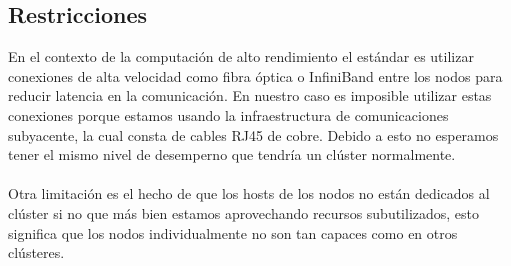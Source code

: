 \subsection{Restricciones}
En el contexto de la computación de alto rendimiento el estándar es utilizar conexiones de alta velocidad como fibra óptica o InfiniBand entre los nodos para reducir latencia en la comunicación. En nuestro caso es imposible utilizar estas conexiones porque estamos usando la infraestructura de comunicaciones subyacente, la cual consta de cables RJ45 de cobre. Debido a esto no esperamos tener el mismo nivel de desemperno que tendría un clúster normalmente.\\
\\
Otra limitación es el hecho de que los hosts de los nodos no están dedicados al clúster si no que más bien estamos aprovechando recursos subutilizados, esto significa que los nodos individualmente no son tan capaces como en otros clústeres.

